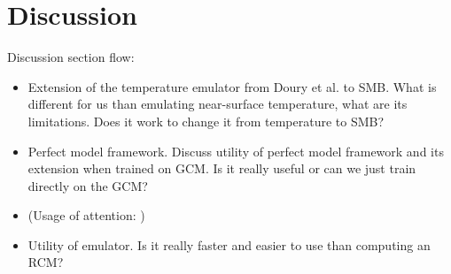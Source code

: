 \documentclass[a4paper,11pt,oneside]{report}
\begin{document}
\chapter{Discussion}
Discussion section flow:
\begin{itemize}
    \item Extension of the temperature emulator from Doury et al. to SMB. What is different for us than emulating near-surface temperature, what are its limitations. Does it work to change it from temperature to SMB? 
    \item Perfect model framework. Discuss utility of perfect model framework and its extension when trained on GCM. Is it really useful or can we just train directly on the GCM?  
    \item (Usage of attention: )
    \item Utility of emulator. Is it really faster and easier to use than computing an RCM? 
\end{itemize}
\end{document}
